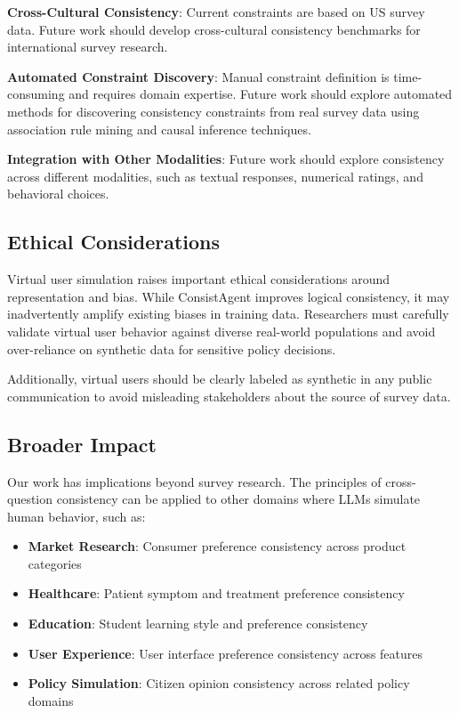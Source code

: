 \documentclass[sigconf, anonymous]{acmart}
\begin{document}
\textbf{Cross-Cultural Consistency}: Current constraints are based on US survey data. Future work should develop cross-cultural consistency benchmarks for international survey research.

\textbf{Automated Constraint Discovery}: Manual constraint definition is time-consuming and requires domain expertise. Future work should explore automated methods for discovering consistency constraints from real survey data using association rule mining and causal inference techniques.

\textbf{Integration with Other Modalities}: Future work should explore consistency across different modalities, such as textual responses, numerical ratings, and behavioral choices.

\subsection{Ethical Considerations}

Virtual user simulation raises important ethical considerations around representation and bias. While ConsistAgent improves logical consistency, it may inadvertently amplify existing biases in training data. Researchers must carefully validate virtual user behavior against diverse real-world populations and avoid over-reliance on synthetic data for sensitive policy decisions.

Additionally, virtual users should be clearly labeled as synthetic in any public communication to avoid misleading stakeholders about the source of survey data.

\subsection{Broader Impact}

Our work has implications beyond survey research. The principles of cross-question consistency can be applied to other domains where LLMs simulate human behavior, such as:

\begin{itemize}
    \item \textbf{Market Research}: Consumer preference consistency across product categories
    \item \textbf{Healthcare}: Patient symptom and treatment preference consistency
    \item \textbf{Education}: Student learning style and preference consistency
    \item \textbf{User Experience}: User interface preference consistency across features
    \item \textbf{Policy Simulation}: Citizen opinion consistency across related policy domains
\end{itemize}
\end{document}
